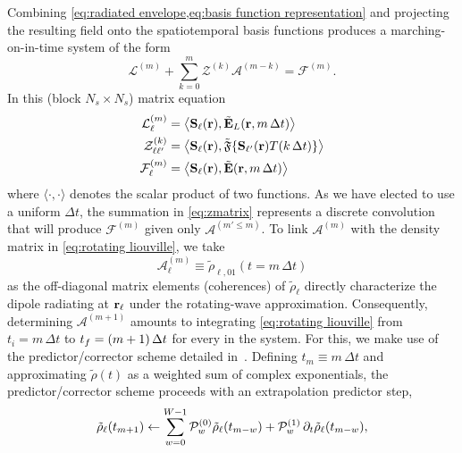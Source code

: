 Combining \cref{eq:radiated envelope,eq:basis function representation} and projecting the resulting field onto the spatiotemporal basis functions produces a marching-on-in-time system of the form
\begin{equation}
  \mathcal{L}^{(m)} + \sum_{k = 0}^{m} \mathcal{Z}^{(k)} \mathcal{A}^{(m - k)} = \mathcal{F}^{(m)}.
  \label{eq:zmatrix}
\end{equation}
In this (block $N_s \times N_s$) matrix equation
\begin{subequations}
  \begin{align}
    \mathcal{L}^{(m)}_{\ell} &= \big\langle \mathbf{S}_\ell(\vb{r}), \tilde{\vb{E}}_L(\vb{r}, m \, \Delta t) \big\rangle \\
    \mathcal{Z}^{(k)}_{\ell \ell'} &= \big\langle \mathbf{S}_\ell(\vb{r}), \tilde{\mathfrak{F}}\{ \mathbf{S}_{\ell'}(\mathbf{r}) T(k \, \Delta t) \} \big\rangle \\
    \mathcal{F}^{(m)}_\ell &= \big\langle \mathbf{S}_\ell(\vb{r}), \tilde{\mathbf{E}}(\vb{r}, m \, \Delta t) \big\rangle
  \end{align}
  \label{eq:projections}
\end{subequations}
where $\langle \cdot, \cdot \rangle$ denotes the scalar product of two functions.
As we have elected to use a uniform $\Delta t$, the summation in \cref{eq:zmatrix} represents a discrete convolution that will produce $\mathcal{F}^{(m)}$ given only $\mathcal{A}^{(m' \le m)}$.
To link $\mathcal{A}^{(m)}$ with the density matrix in \cref{eq:rotating liouville}, we take
\begin{equation}
  \mathcal{A}^{(m)}_\ell \equiv \tilde{\rho}_{\ell, 01}(t = m \, \Delta t)
  \label{eq:polarization definition}
\end{equation}
as the off-diagonal matrix elements (coherences) of $\tilde{\rho}_{\ell}$ directly characterize the dipole radiating at $\vb{r}_\ell$ under the rotating-wave approximation.
Consequently, determining $\mathcal{A}^{(m + 1)}$ amounts to integrating \cref{eq:rotating liouville} from $t_i = m \, \Delta t$ to $t_f = \qty(m + 1) \, \Delta t$ for every \qd{} in the system.
For this, we make use of the predictor/corrector scheme detailed in~\cite{Glaser2009}.
Defining $t_m \equiv m \, \Delta t$ and approximating $\tilde{\rho}(t)$ as a weighted sum of complex exponentials, the predictor/corrector scheme proceeds with an extrapolation predictor step,
\begin{equation}
  \tilde{\rho}_\ell(t_{m + 1}) \leftarrow \sum_{w = 0}^{W-1} \mathcal{P}_w^{\qty(0)} \tilde{\rho}_\ell(t_{m-w}) + \mathcal{P}_w^{\qty(1)} \, \partial_t \tilde{\rho}_\ell(t_{m-w}),
  \label{eq:predictor}
\end{equation}
